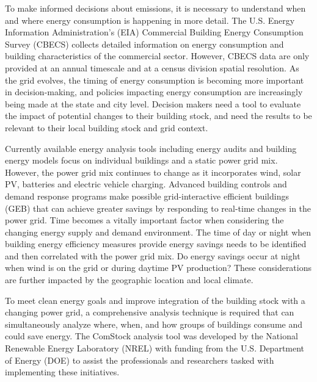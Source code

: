 To make informed decisions about emissions, it is necessary to understand when and where energy consumption is happening in more detail. The U.S. Energy Information Administration's (EIA) Commercial Building Energy Consumption Survey (CBECS) collects detailed information on energy consumption and building characteristics of the commercial sector. However, CBECS data are only provided at an annual timescale and at a census division spatial resolution. As the grid evolves, the timing of energy consumption is becoming more important in decision-making, and policies impacting energy consumption are increasingly being made at the state and city level. Decision makers need a tool to evaluate the impact of potential changes to their building stock, and need the results to be relevant to their local building stock and grid context.

Currently available energy analysis tools including energy audits and building energy models focus on individual buildings and a static power grid mix. However, the power grid mix continues to change as it incorporates wind, solar PV, batteries and electric vehicle charging. Advanced building controls and demand response programs make possible grid-interactive efficient buildings (GEB) that can achieve greater savings by responding to real-time changes in the power grid. Time becomes a vitally important factor when considering the changing energy supply and demand environment. The time of day or night when building energy efficiency measures provide energy savings needs to be identified and then correlated with the power grid mix. Do energy savings occur at night when wind is on the grid or during daytime PV production? These considerations are further impacted by the geographic location and local climate.

To meet clean energy goals and improve integration of the building stock with a changing power grid, a comprehensive analysis technique is required that can simultaneously analyze where, when, and how groups of buildings consume and could save energy. The ComStock analysis tool was developed by the National Renewable Energy Laboratory (NREL) with funding from the U.S. Department of Energy (DOE) to assist the professionals and researchers tasked with implementing these initiatives.